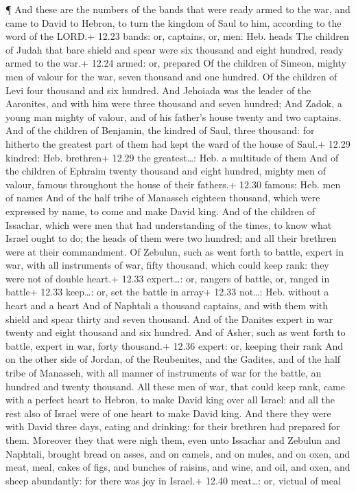  ¶ And these are the numbers of the bands that were ready
armed to the war, and came to David to Hebron, to turn the kingdom of
Saul to him, according to the word of the LORD.+ 12.23 bands: or,
captains, or, men: Heb. heads  The children of Judah that
bare shield and spear were six thousand and eight hundred, ready armed
to the war.+ 12.24 armed: or, prepared  Of the children of
Simeon, mighty men of valour for the war, seven thousand and one
hundred.  Of the children of Levi four thousand and six
hundred.  And Jehoiada was the leader of the Aaronites, and
with him were three thousand and seven hundred;  And Zadok,
a young man mighty of valour, and of his father's house twenty and two
captains.  And of the children of Benjamin, the kindred of
Saul, three thousand: for hitherto the greatest part of them had kept
the ward of the house of Saul.+ 12.29 kindred: Heb. brethren+ 12.29 the
greatest\ldots: Heb. a multitude of them  And of the
children of Ephraim twenty thousand and eight hundred, mighty men of
valour, famous throughout the house of their fathers.+ 12.30 famous:
Heb. men of names  And of the half tribe of Manasseh
eighteen thousand, which were expressed by name, to come and make David
king.  And of the children of Issachar, which were men that
had understanding of the times, to know what Israel ought to do; the
heads of them were two hundred; and all their brethren were at their
commandment.  Of Zebulun, such as went forth to battle,
expert in war, with all instruments of war, fifty thousand, which could
keep rank: they were not of double heart.+ 12.33 expert\ldots: or,
rangers of battle, or, ranged in battle+ 12.33 keep\ldots: or, set the
battle in array+ 12.33 not\ldots: Heb. without a heart and a heart
 And of Naphtali a thousand captains, and with them with
shield and spear thirty and seven thousand.  And of the
Danites expert in war twenty and eight thousand and six hundred.
 And of Asher, such as went forth to battle, expert in war,
forty thousand.+ 12.36 expert: or, keeping their rank  And
on the other side of Jordan, of the Reubenites, and the Gadites, and of
the half tribe of Manasseh, with all manner of instruments of war for
the battle, an hundred and twenty thousand.  All these men
of war, that could keep rank, came with a perfect heart to Hebron, to
make David king over all Israel: and all the rest also of Israel were of
one heart to make David king.  And there they were with
David three days, eating and drinking: for their brethren had prepared
for them.  Moreover they that were nigh them, even unto
Issachar and Zebulun and Naphtali, brought bread on asses, and on
camels, and on mules, and on oxen, and meat, meal, cakes of figs, and
bunches of raisins, and wine, and oil, and oxen, and sheep abundantly:
for there was joy in Israel.+ 12.40 meat\ldots: or, victual of meal

